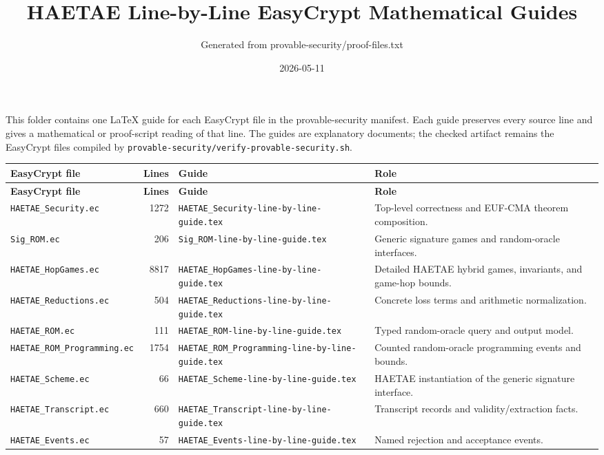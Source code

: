 \documentclass[11pt]{article}
\title{HAETAE Line-by-Line EasyCrypt Mathematical Guides}
\author{Generated from provable-security/proof-files.txt}
\date{2026-05-11}
\newcommand{\file}[1]{\nolinkurl{#1}}
\begin{document}
\maketitle

This folder contains one LaTeX guide for each EasyCrypt file in the
provable-security manifest.  Each guide preserves every source line and gives a
mathematical or proof-script reading of that line.  The guides are explanatory
documents; the checked artifact remains the EasyCrypt files compiled by
\file{provable-security/verify-provable-security.sh}.

\begin{longtable}{L{0.24\textwidth} r L{0.28\textwidth} L{0.34\textwidth}}
\toprule
\textbf{EasyCrypt file} & \textbf{Lines} & \textbf{Guide} & \textbf{Role} \\
\midrule
\endfirsthead
\toprule
\textbf{EasyCrypt file} & \textbf{Lines} & \textbf{Guide} & \textbf{Role} \\
\midrule
\endhead
\file{HAETAE\_Security.ec} & 1272 & \file{HAETAE\_Security-line-by-line-guide.tex} & Top-level correctness and EUF-CMA theorem composition. \\
\file{Sig\_ROM.ec} & 206 & \file{Sig\_ROM-line-by-line-guide.tex} & Generic signature games and random-oracle interfaces. \\
\file{HAETAE\_HopGames.ec} & 8817 & \file{HAETAE\_HopGames-line-by-line-guide.tex} & Detailed HAETAE hybrid games, invariants, and game-hop bounds. \\
\file{HAETAE\_Reductions.ec} & 504 & \file{HAETAE\_Reductions-line-by-line-guide.tex} & Concrete loss terms and arithmetic normalization. \\
\file{HAETAE\_ROM.ec} & 111 & \file{HAETAE\_ROM-line-by-line-guide.tex} & Typed random-oracle query and output model. \\
\file{HAETAE\_ROM\_Programming.ec} & 1754 & \file{HAETAE\_ROM\_Programming-line-by-line-guide.tex} & Counted random-oracle programming events and bounds. \\
\file{HAETAE\_Scheme.ec} & 66 & \file{HAETAE\_Scheme-line-by-line-guide.tex} & HAETAE instantiation of the generic signature interface. \\
\file{HAETAE\_Transcript.ec} & 660 & \file{HAETAE\_Transcript-line-by-line-guide.tex} & Transcript records and validity/extraction facts. \\
\file{HAETAE\_Events.ec} & 57 & \file{HAETAE\_Events-line-by-line-guide.tex} & Named rejection and acceptance events. \\

\end{longtable}
\end{document}
